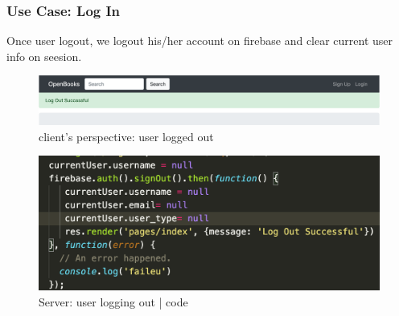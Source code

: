 \documentclass[letter, 12pt, titlepage]{article}
\begin{document}
\newpage

\subsubsection{Use Case: Log In}
	Once user logout, we logout his/her account on firebase and clear current user info on seesion.

	\begin{figure}[h!]
		\centering
		\includegraphics[scale=0.50]{logout.png}
		\caption{client's perspective: user logged out}
	\end{figure}

	\begin{figure}[h!]
		\centering
		\includegraphics[scale=0.50]{logout-code.png}
		\caption{Server: user logging out | code}
	\end{figure}

\newpage
\end{document}
